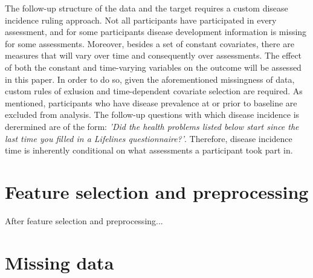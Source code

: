 The follow-up structure of the data and the target requires a custom disease incidence ruling approach. Not all participants have participated in every assessment, and for some participants disease development information is missing for some assessments. Moreover, besides a set of constant covariates, there are measures that will vary over time and consequently over assessments. The effect of both the constant and time-varying variables on the outcome will be assessed in this paper. In order to do so, given the aforementioned missingness of data, custom rules of exlusion and time-dependent covariate selection are required. 
As mentioned, participants who have disease prevalence at or prior to baseline are excluded from analysis. The follow-up questions with which disease incidence is derermined are of the form: \textit{'Did the health problems listed below start since the last time you filled in a Lifelines questionnaire?'}. Therefore, disease incidence time is inherently conditional on what assessments a participant took part in. 



\section{Feature selection and preprocessing}
\label{section:data:feature_selection_and_preprocessing}
After feature selection and preprocessing... 


\section{Missing data}
\label{section:data:missing_data}


